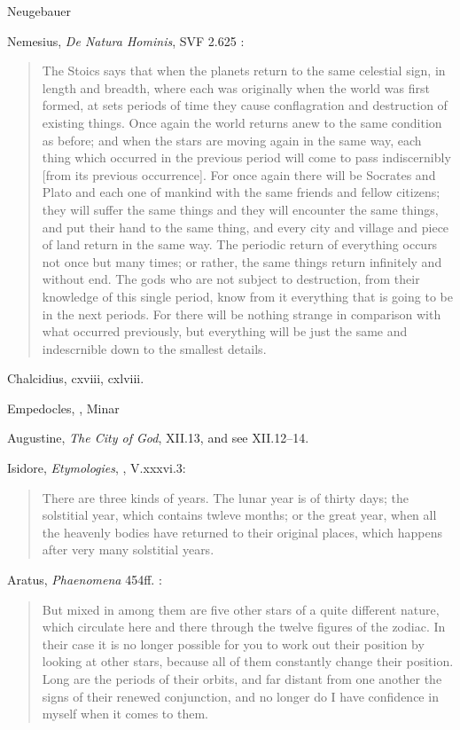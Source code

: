 \documentclass{article}
\begin{document}
Neugebauer \cite[p.~618, 749]{neugebauer}


Nemesius, {\em De Natura Hominis}, SVF 2.625 \cite[p.~309]{longsedleyI}:

\begin{quote}
The Stoics says that when the planets return to the same celestial sign, in length and breadth, where each was originally when the world was first formed,
at sets periods of time they cause conflagration and destruction of existing things. Once again the world returns anew to the same condition as before; and when
the stars are moving again in the same way, each thing which occurred in the previous period will come to pass indiscernibly [from its previous occurrence]. For
once again there will be Socrates and Plato and each one of mankind with the same friends and fellow citizens; they will suffer the same things and they will encounter
the same things, and put their hand to the same thing, and every city and village and piece of land return in the same way. The periodic return of everything occurs not
once but many times; or rather, the same things return infinitely and without end. The gods who are not subject to destruction, from their knowledge of this single
period, know from it everything that is going to be in the next periods. For there will be nothing strange in comparison with what occurred previously, but everything
will be just the same and indescrnible down to the smallest details.
\end{quote}
 
Chalcidius, cxviii, cxlviii.

Empedocles, \cite{obrien}, Minar \cite{minar}

Augustine, {\em The City of God}, XII.13, and see XII.12--14.

Isidore, {\em Etymologies}, \cite{isidore}, V.xxxvi.3: 

\begin{quote}
There are three kinds of years. The lunar year is of thirty days; the solstitial year, which contains twleve months;
or the great year, when all the heavenly bodies have returned to their original places, which happens after
very many solstitial years.
\end{quote}

Aratus, {\em Phaenomena} 454ff. \cite[pp.~149--150]{constellations}:

\begin{quote}
But mixed in among them are five other stars of a quite different nature, which circulate here and there through the twelve figures of the zodiac. In their case
it is no longer possible for you to work out their position by looking at other stars, because all of them constantly change their position. Long are the periods of their orbits,
and far distant from one another the signs of their renewed conjunction, and no longer do I have confidence in myself when it comes to them.
\end{quote}
\end{document}
